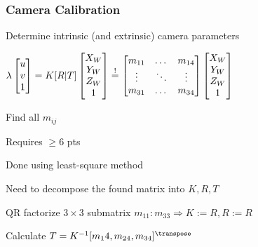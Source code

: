 \subsubsection{Camera Calibration}
\begin{itemize*}
    \item Determine intrinsic (and extrinsic) camera parameters
    \item $\lambda
        \begin{bmatrix}
            u\\
            v\\
            1
        \end{bmatrix} = K [R|T]
        \begin{bmatrix}
            X_W\\
            Y_W\\
            Z_W\\
            1
        \end{bmatrix} \overset{!}{=} \linebreak
        \begin{bmatrix}
            m_{11} & \dots & m_{14}\\
            \vdots & \ddots & \vdots\\
            m_{31} & \dots & m_{34}
        \end{bmatrix}
        \begin{bmatrix}
            X_W\\
            Y_W\\
            Z_W\\
            1
        \end{bmatrix}$
    \item Find all $m_{ij}$
    \item Requires $\ge 6$ pts
    \item Done using least-square method
    \item Need to decompose the found matrix into $K, R, T$
    \item QR factorize $3 \times 3$ submatrix $m_{11}:m_{33} \Rightarrow K := R, R := R$
    \item Calculate $T = K^{-1}[m_14, m_{24}, m_{34}]^\transpose$
\end{itemize*}

